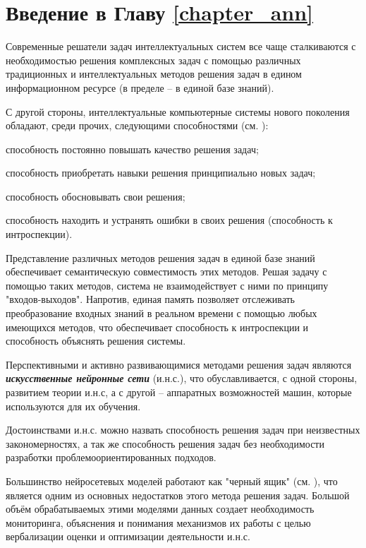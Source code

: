 \section*{Введение в Главу \ref{chapter_ann}}

Современные решатели задач интеллектуальных систем все чаще сталкиваются с необходимостью решения комплексных задач с помощью различных традиционных и интеллектуальных методов решения задач в едином информационном ресурсе (в пределе -- в единой базе знаний).

С другой стороны, интеллектуальные компьютерные системы нового поколения обладают, среди прочих, следующими способностями (см. ):
\begin{textitemize}
	\item способность постоянно повышать качество решения задач;
	\item способность приобретать навыки решения принципиально новых задач;
	\item способность обосновывать свои решения;
	\item способность находить и устранять ошибки в своих решения (способность к интроспекции).
\end{textitemize}

Представление различных методов решения задач в единой базе знаний обеспечивает семантическую совместимость этих методов. Решая задачу с помощью таких методов, система не взаимодействует с ними по принципу "входов-выходов"{}. Напротив, единая память позволяет отслеживать преобразование входных знаний в реальном времени с помощью любых имеющихся методов, что обеспечивает способность к интроспекции и способность объяснять решения системы.

Перспективными и активно развивающимися методами решения задач являются \textbf{\textit{искусственные нейронные сети}} (и.н.с.), что обуславливается, с одной стороны, развитием теории и.н.с, а с другой -- аппаратных возможностей машин, которые используются для их обучения.

Достоинствами и.н.с. можно назвать способность решения задач при неизвестных закономерностях, а так же способность решения задач без необходимости разработки проблемоориентированных подходов.

Большинство нейросетевых моделей работают как "черный ящик"{} (см. ), что является одним из основных недостатков этого метода решения задач. Большой объём обрабатываемых этими моделями данных создает необходимость мониторинга, объяснения и понимания механизмов их работы с целью вербализации оценки и оптимизации деятельности и.н.с.

